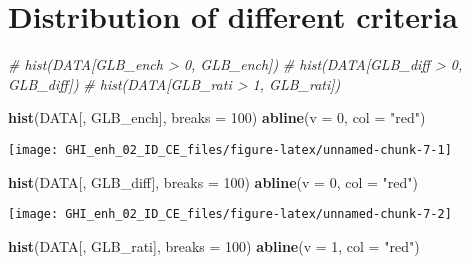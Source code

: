 \documentclass[
  10pt,
  a4paper,oneside]{article}
\newenvironment{Shaded}{\begin{snugshade}}{\end{snugshade}}
\newcommand{\AttributeTok}[1]{\textcolor[rgb]{0.13,0.29,0.53}{#1}}
\newcommand{\CommentTok}[1]{\textcolor[rgb]{0.56,0.35,0.01}{\textit{#1}}}
\newcommand{\DecValTok}[1]{\textcolor[rgb]{0.00,0.00,0.81}{#1}}
\newcommand{\FunctionTok}[1]{\textcolor[rgb]{0.13,0.29,0.53}{\textbf{#1}}}
\newcommand{\NormalTok}[1]{#1}
\newcommand{\StringTok}[1]{\textcolor[rgb]{0.31,0.60,0.02}{#1}}
\begin{document}
\FloatBarrier

\hypertarget{distribution-of-different-criteria}{%
\section{Distribution of different criteria}\label{distribution-of-different-criteria}}

\begin{Shaded}
\begin{Highlighting}[]
\CommentTok{\# hist(DATA[GLB\_ench \textgreater{} 0, GLB\_ench])}
\CommentTok{\# hist(DATA[GLB\_diff \textgreater{} 0, GLB\_diff])}
\CommentTok{\# hist(DATA[GLB\_rati \textgreater{} 1, GLB\_rati])}

\FunctionTok{hist}\NormalTok{(DATA[, GLB\_ench], }\AttributeTok{breaks =} \DecValTok{100}\NormalTok{)}
\FunctionTok{abline}\NormalTok{(}\AttributeTok{v =} \DecValTok{0}\NormalTok{, }\AttributeTok{col =} \StringTok{"red"}\NormalTok{)}
\end{Highlighting}
\end{Shaded}

\begin{center}\texttt{[image: GHI\_enh\_02\_ID\_CE\_files/figure-latex/unnamed-chunk-7-1]} \end{center}

\begin{Shaded}
\begin{Highlighting}[]
\FunctionTok{hist}\NormalTok{(DATA[, GLB\_diff], }\AttributeTok{breaks =} \DecValTok{100}\NormalTok{)}
\FunctionTok{abline}\NormalTok{(}\AttributeTok{v =} \DecValTok{0}\NormalTok{, }\AttributeTok{col =} \StringTok{"red"}\NormalTok{)}
\end{Highlighting}
\end{Shaded}

\begin{center}\texttt{[image: GHI\_enh\_02\_ID\_CE\_files/figure-latex/unnamed-chunk-7-2]} \end{center}

\begin{Shaded}
\begin{Highlighting}[]
\FunctionTok{hist}\NormalTok{(DATA[, GLB\_rati], }\AttributeTok{breaks =} \DecValTok{100}\NormalTok{)}
\FunctionTok{abline}\NormalTok{(}\AttributeTok{v =} \DecValTok{1}\NormalTok{, }\AttributeTok{col =} \StringTok{"red"}\NormalTok{)}
\end{Highlighting}
\end{Shaded}
\end{document}
